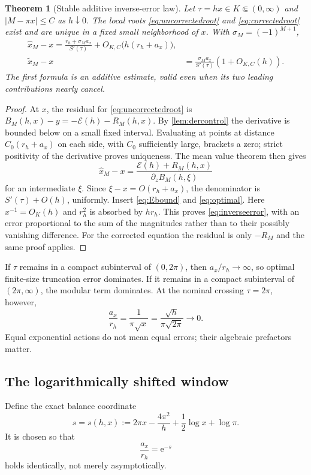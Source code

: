 \documentclass[11pt,a4paper]{article}
\newcommand{\ee}{\mathrm e}
\newcommand{\E}{\mathcal E}
\numberwithin{equation}{section}
\theoremstyle{plain}
\newtheorem{theorem}{Theorem}[section]
\theoremstyle{definition}
\theoremstyle{remark}
\begin{document}
\begin{theorem}[Stable additive inverse-error law]
\label{thm:inverse}
Let $\tau=hx\in K\Subset(0,\infty)$ and $|M-\pi x|\le C$ as $h\downarrow0$.
The local roots \eqref{eq:uncorrectedroot} and \eqref{eq:correctedroot} exist
and are unique in a fixed small neighborhood of $x$. With
$\sigma_M=(-1)^{M+1}$,
\begin{align}
 \boxed{\widehat x_M-x
 =\frac{r_h+\sigma_M a_x}{S'(\tau)}
                         +O_{K,C}\bigl(h(r_h+a_x)\bigr),}
 \label{eq:inverseerror}\\
 \widetilde x_M-x
 &=\frac{\sigma_M a_x}{S'(\tau)}(1+O_{K,C}(h)).
 \label{eq:correctederror}
\end{align}
The first formula is an \emph{additive} estimate, valid even when its two
leading contributions nearly cancel.
\end{theorem}
\begin{proof}
At $x$, the residual for \eqref{eq:uncorrectedroot} is
$B_M(h,x)-y=-\E(h)-R_M(h,x)$. By \cref{lem:dercontrol} the derivative is
bounded below on a small fixed interval. Evaluating at points at distance
$C_0(r_h+a_x)$ on each side, with $C_0$ sufficiently large, brackets a zero;
strict positivity of the derivative proves uniqueness. The mean value
theorem then gives
\[
 \widehat x_M-x=\frac{\E(h)+R_M(h,x)}
                         {\partial_zB_M(h,\xi)}
\]
for an intermediate $\xi$. Since $\xi-x=O(r_h+a_x)$, the denominator is
$S'(\tau)+O(h)$, uniformly. Insert \eqref{eq:Ebound} and
\eqref{eq:optimal}. Here $x^{-1}=O_K(h)$ and $r_h^2$ is absorbed by $hr_h$.
This proves \eqref{eq:inverseerror}, with an error proportional to the sum
of the magnitudes rather than to their possibly vanishing difference.
For the corrected equation the residual is only $-R_M$ and the same proof
applies.
\end{proof}

If $\tau$ remains in a compact subinterval of $(0,2\pi)$, then
$a_x/r_h\to\infty$, so optimal finite-size truncation error dominates.
If it remains in a compact subinterval of $(2\pi,\infty)$, the modular term
dominates. At the nominal crossing $\tau=2\pi$, however,
\begin{equation}
 \frac{a_x}{r_h}=\frac1{\pi\sqrt{x}}
          =\frac{\sqrt h}{\pi\sqrt{2\pi}}\longrightarrow0.
 \label{eq:nominalcross}
\end{equation}
Equal exponential actions do not mean equal errors; their algebraic
prefactors matter.

\subsection{The logarithmically shifted window}
Define the exact balance coordinate
\begin{equation}
 s=s(h,x):=2\pi x-\frac{4\pi^2}{h}
                   +\frac12\log x+\log\pi.
 \label{eq:swindow}
\end{equation}
It is chosen so that
\begin{equation}
 \frac{a_x}{r_h}=\ee^{-s}
 \label{eq:balanceratio}
\end{equation}
holds identically, not merely asymptotically.
\end{document}
